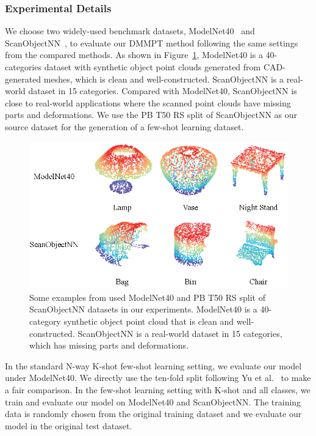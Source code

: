 \documentclass{ecai}
\begin{document}
\subsubsection{Experimental Details}
We choose two widely-used benchmark datasets, ModelNet40~\cite{wu20153d} and ScanObjectNN~\cite{uy2019revisiting}, to evaluate our DMMPT method following the same settings from the compared methods. As shown in Figure~\ref{dataset}, ModelNet40 is a 40-categories dataset with synthetic object point clouds generated from CAD-generated meshes, which is clean and well-constructed. ScanObjectNN is a real-world dataset in 15 categories. Compared with ModelNet40, ScanObjectNN is close to real-world applications where the scanned point clouds have missing parts and deformations. We use the PB T50 RS split of ScanObjectNN as our source dataset for the generation of a few-shot learning dataset. 

\begin{figure}[t]
\centerline{\includegraphics[width=0.95\linewidth]{dataset.eps}}
\caption{Some examples from used ModelNet40 and PB T50 RS split of ScanObjectNN datasets in our experiments. ModelNet40 is a 40-category synthetic object point cloud that is clean and well-constructed. ScanObjectNN is a real-world dataset in 15 categories, which has missing parts and deformations.}\label{dataset}
\vspace{4pt}
\end{figure}

In the standard N-way K-shot few-shot learning setting, we evaluate our model under ModelNet40. We directly use the ten-fold split following 
Yu et al.~\cite{yu2022point}
to make a fair comparison. In the few-shot learning setting with K-shot and all classes, we  
 train and evaluate our model on ModelNet40 and ScanObjectNN. The training data is randomly chosen from the original training dataset and we evaluate our model in the original test dataset. 
\end{document}
